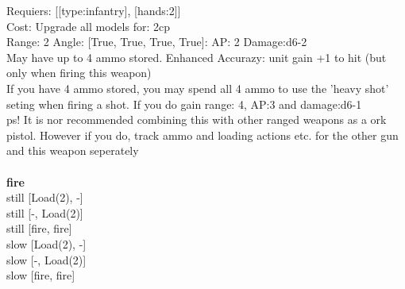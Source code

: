 Requiers: [[type:infantry], [hands:2]] \\
Cost: Upgrade all models for: 2cp \\


Range: 2  Angle: [True, True, True, True]: AP: 2 Damage:d6-2 \\
May have up to 4 ammo stored. Enhanced Accurazy: unit gain +1 to hit (but only when firing this weapon)\\ 
If you have 4 ammo stored, you may spend all 4 ammo to use the 'heavy shot' seting when firing a shot. If you do gain range: 4, AP:3 and damage:d6-1\\ 
 ps! It is nor recommended combining this with other ranged weapons as a ork pistol. However if you do, track ammo and loading actions etc. for the other gun and this weapon seperately\\ 







\ \\ {\bf fire } \\
still [Load(2), -] \\
still [-, Load(2)] \\
still [fire, fire] \\
slow [Load(2), -] \\
slow [-, Load(2)] \\
slow [fire, fire] \\

